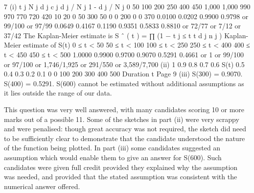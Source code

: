 \documentclass[a4paper,12pt]{article}
\begin{document}

7
(i)
t j N j d j c j d j / N j 1 - d j / N j 0
50
100
200
250
400
450 1,000
1,000
990
970
770
720
420 10
20
0
50
300
50 0
0
200
0
0
370 0.0100
0.0202 0.9900
0.9798 or 99/100
or 97/99
0.0649
0.4167
0.1190 0.9351
0.5833
0.8810 or 72/77
or 7/12
or 37/42
The Kaplan-Meier estimate is S ˆ ( t ) = ∏ (1 −
t j ≤ t
t
d j
n j
)
Kaplan-Meier estimate of S(t)
0 ≤ t < 50
50 ≤ t < 100
100 ≤ t < 250
250 ≤ t < 400
400 ≤ t < 450
450 ≤ t < 500
1.0000
0.9900
0.9700
0.9070
0.5291
0.4661
or 1
or 99/100
or 97/100
or 1,746/1,925
or 291/550
or 3,589/7,700
(ii)
1
0.9
0.8
0.7
0.6
S(t) 0.5
0.4
0.3
0.2
0.1
0
0
100
200
300
400
500
Duration t
Page 9 %
(iii)
S(300) = 0.9070.
S(400) = 0.5291.
S(600) cannot be estimated without additional assumptions
as it lies outside the range of our data.

\newpage

This question was very well answered, with many candidates scoring 10 or more marks out of
a possible 11. Some of the sketches in part (ii) were very scrappy and were penalised:
though great accuracy was not required, the sketch did need to be sufficiently clear to
demonstrate that the candidate understood the nature of the function being plotted. In part
(iii) some candidates suggested an assumption which would enable them to give an answer
for S(600). Such candidates were given full credit provided they explained why the
assumption was needed, and provided that the stated assumption was consistent with the
numerical answer offered.
\end{document}
